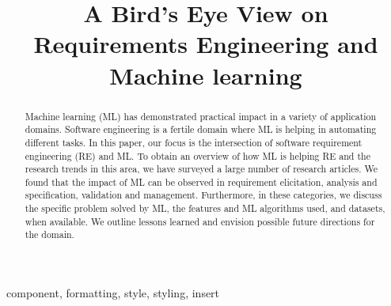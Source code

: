 \documentclass[conference]{IEEEtran}
\begin{document}
\title{A Bird’s Eye View on Requirements Engineering and Machine learning} 

\author{
\and
{} 
\and
{}
}   
\maketitle

\begin{abstract}
Machine learning (ML) has demonstrated practical impact in a variety of application domains. Software engineering is a fertile domain where ML is helping in automating  different tasks. In this paper, our focus is the intersection of software requirement engineering (RE) and ML.  To obtain an overview of how ML is helping RE and the research trends in this area, we have surveyed a large number of research articles. We found that the impact of ML can be observed in requirement elicitation, analysis and specification, validation and management. Furthermore, in these categories, we discuss the specific problem solved by ML, the features and ML algorithms used, and datasets, when available. We outline lessons learned and envision possible future directions for the domain.
\end{abstract}

\begin{IEEEkeywords}
component, formatting, style, styling, insert
\end{IEEEkeywords}
  
 
 
   
 
  
 
  
\end{document}
